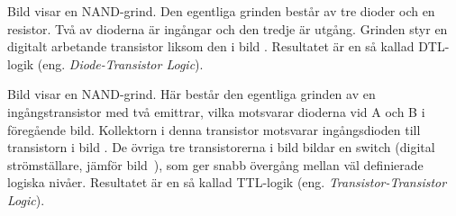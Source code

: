 
Bild  visar en NAND-grind.
Den egentliga grinden består av tre dioder och en resistor.
Två av dioderna är ingångar och den tredje är utgång.
Grinden styr en digitalt arbetande transistor liksom den i bild
.
Resultatet är en så kallad DTL-logik (eng. \emph{Diode-Transistor Logic}).


Bild  visar en NAND-grind.
Här består den egentliga grinden av en ingångstransistor med två emittrar,
vilka motsvarar dioderna vid A och B i föregående bild.
Kollektorn i denna transistor motsvarar ingångsdioden till transistorn i bild
.
De övriga tre transistorerna i bild  bildar en switch
(digital strömställare, jämför bild~), som ger snabb
övergång mellan väl definierade logiska nivåer.
Resultatet är en så kallad TTL-logik (eng. \emph{Transistor-Transistor Logic}).
